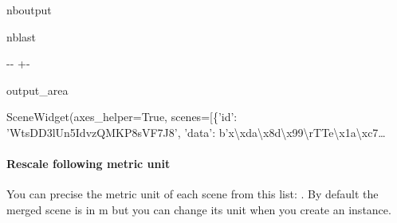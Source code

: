 \documentclass[letterpaper,10pt,english]{sphinxmanual}
\begin{document}
\begin{sphinxuseclass}{nboutput}
\begin{sphinxuseclass}{nblast}
{

\kern-\sphinxverbatimsmallskipamount\kern-\baselineskip
\kern+\FrameHeightAdjust\kern-\fboxrule
\vspace{\nbsphinxcodecellspacing}

\begin{sphinxuseclass}{output_area}
\begin{sphinxuseclass}{}


\begin{sphinxVerbatim}[commandchars=\\\{\}]
\llap{\color{nbsphinxout}[16]:\,\hspace{\fboxrule}\hspace{\fboxsep}}SceneWidget(axes\_helper=True, scenes=[\{'id': 'WtsDD3lUn5IdvzQMKP8sVF7J8', 'data': b'x\textbackslash{}xda\textbackslash{}x8d\textbackslash{}x99\textbackslash{}rTTe\textbackslash{}x1a\textbackslash{}xc7…
\end{sphinxVerbatim}



\end{sphinxuseclass}
\end{sphinxuseclass}
}

\end{sphinxuseclass}
\end{sphinxuseclass}

\paragraph{Rescale following metric unit}
\label{\detokenize{input_scenes:Rescale-following-metric-unit}}
\sphinxAtStartPar
You can precise the metric unit of each scene from this list: . By default the merged scene is in m but you can change its unit when you create an instance.
\end{document}
